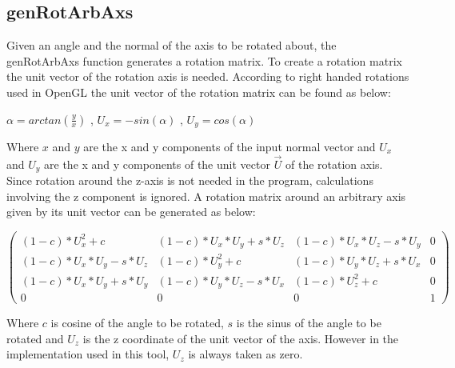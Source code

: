 \documentclass[a4paper]{article}
\begin{document}
\subsection{genRotArbAxs}
Given an angle and the normal of the axis to be rotated about, the genRotArbAxs function generates a rotation matrix. \newline
To create a rotation matrix the unit vector of the rotation axis is needed. According to right handed rotations used in OpenGL the unit vector of the rotation matrix can be found as below:
\begin{center}
\begin{math}
\alpha = arctan\left(\frac{y}{x}\right)
\end{math}
,
\begin{math}
U_x = -sin(\alpha)
\end{math}
,
\begin{math}
U_y = cos(\alpha)
\end{math}
\end{center}
Where $x$ and $y$ are the x and y components of the input normal vector and $U_x$ and $U_y$ are the x and y components of the unit vector $\vec{U}$ of the rotation axis. Since rotation around the z-axis is not needed in the program, calculations involving the z component is ignored. A rotation matrix around an arbitrary axis given by its unit vector can be generated as below:
\begin{center}
\[ \left( \begin{array}{cccc}
(1 - c) * U_x^2 + c & 
(1 - c) * U_x * U_y  + s * U_z	& 
(1 - c) * U_x * U_z-s * U_y & 
0 \\
(1 - c) * U_x * U_y - s * U_z	& 
(1 - c) * U_y^2 + c	& 
(1 - c) * U_y * U_z + s * U_x & 
0 \\
(1 - c) * U_x * U_y + s * U_y & 
(1 - c) * U_y * U_z -s * U_x & 
(1 - c) * U_z^2 + c & 
0 \\
0 & 
0 & 
0 & 
1 \end{array} \right)\] 
\end{center}
Where $c$ is cosine of the angle to be rotated, $s$ is the sinus of the angle to be rotated and $U_z$ is the z coordinate of the unit vector of the axis. However in the implementation used in this tool, $U_z$ is always taken as zero.
\end{document}
